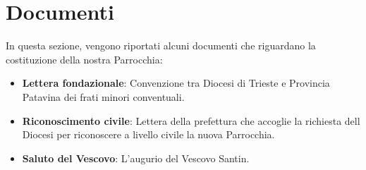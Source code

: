 \chapter{Documenti}
\label{chap:Documenti}
In questa sezione, vengono riportati alcuni documenti che riguardano la costituzione della nostra Parrocchia:

\begin{itemize}
\item \textbf{Lettera fondazionale}: Convenzione tra Diocesi di Trieste e Provincia Patavina dei frati minori conventuali.
\item \textbf{Riconoscimento civile}: Lettera della prefettura che accoglie la richiesta dell Diocesi per riconoscere a livello civile la nuova Parrocchia.
\item \textbf{Saluto del Vescovo}: L'augurio del Vescovo Santin.
\end{itemize}

